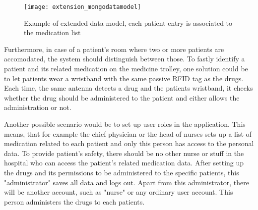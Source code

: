 \begin{figure}
\centering
\texttt{[image: extension\_mongodatamodel]} 
\caption{\label{fig:newdatamodel}Example of extended data model, each patient entry is associated to the medication list} 
\end{figure}

Furthermore, in case of a patient's room where two or more patients are accomodated, the system should distinguish between those. To fastly identify a patient and its related medication on the medicine trolley, one solution could be to let patients wear a wristband with the same passive RFID tag as the drugs. Each time, the same antenna detects a drug and the patients wristband, it checks whether the drug should be administered to the patient and either allows the administration or not.

Another possible scenario would be to set up user roles in the application. This means, that for example the chief physician or the head of nurses sets up a list of medication related to each patient and only this person has access to the personal data. To provide patient's safety, there should be no other nurse or stuff in the hospital who can access the patient's related medication data. After setting up the drugs and its permissions to be administered to the specific patients, this "administrator" saves all data and logs out. 
Apart from this administrator, there will be another account, such as "nurse" or any ordinary user account. This person administers the drugs to each patients.